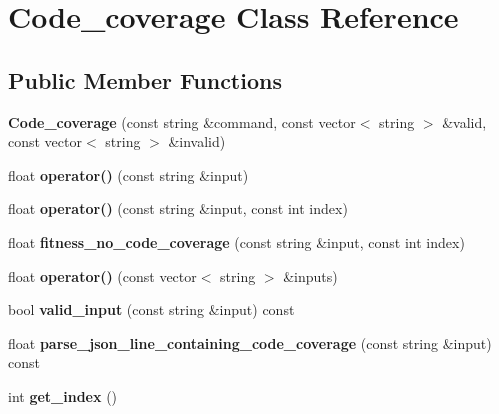 \hypertarget{classCode__coverage}{}\section{Code\+\_\+coverage Class Reference}
\label{classCode__coverage}
\subsection*{Public Member Functions}
\begin{DoxyCompactItemize}
\item 
\mbox{\label{classCode__coverage_a4570f2f0d33500ce33cbf685da607fce}} 
{\bfseries Code\+\_\+coverage} (const string \&command, const vector$<$ string $>$ \&valid, const vector$<$ string $>$ \&invalid)
\item 
\mbox{\label{classCode__coverage_aeb74cc8f2f377a99d5dbbe2e9528f0c5}} 
float {\bfseries operator()} (const string \&input)
\item 
\mbox{\label{classCode__coverage_a8d83072460e5773a12ff9ee04345fdf0}} 
float {\bfseries operator()} (const string \&input, const int index)
\item 
\mbox{\label{classCode__coverage_ab0375987070b4bfc5b00b9e0253aae53}} 
float {\bfseries fitness\+\_\+no\+\_\+code\+\_\+coverage} (const string \&input, const int index)
\item 
\mbox{\label{classCode__coverage_a097d6f4830840819646eea2ceb7bf1ce}} 
float {\bfseries operator()} (const vector$<$ string $>$ \&inputs)
\item 
\mbox{\label{classCode__coverage_a1fe770d3587706a2e0447a1d8a55ca03}} 
bool {\bfseries valid\+\_\+input} (const string \&input) const
\item 
\mbox{\label{classCode__coverage_a4da8f7eb7473e69234edb2e2b48b5e1a}} 
float {\bfseries parse\+\_\+json\+\_\+line\+\_\+containing\+\_\+code\+\_\+coverage} (const string \&input) const
\item 
\mbox{\label{classCode__coverage_ae4e9bb594d405dccde95bc943587c7d0}} 
int {\bfseries get\+\_\+index} ()
\end{DoxyCompactItemize}
